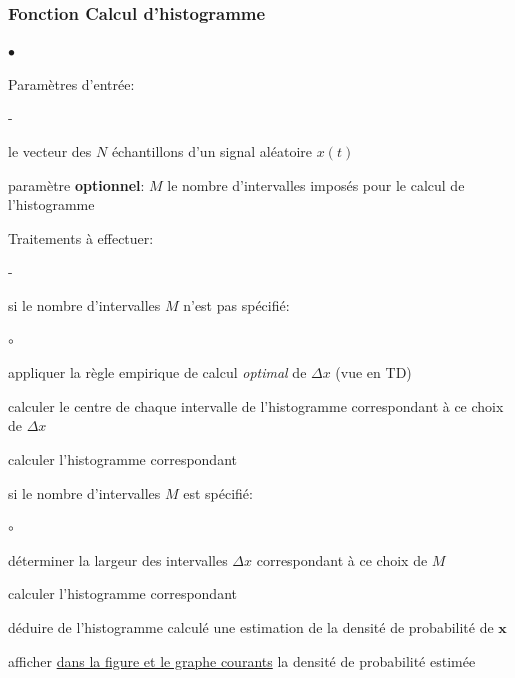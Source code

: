 \documentclass{article}
\begin{document}
\subsubsection{Fonction Calcul d'histogramme}

\begin{list}{$\bullet$}{\setlength{\leftmargin}{3mm} \setlength{\labelwidth}{20mm} \setlength{\labelsep}{2mm} \setlength{\itemsep}{1mm} }
\item Paramètres d'entrée:
\begin{list}{-}{\setlength{\leftmargin}{3mm} \setlength{\labelwidth}{20mm} \setlength{\labelsep}{2mm} \setlength{\itemsep}{1mm} }
\item le vecteur des $N$ échantillons d'un signal aléatoire $x(t)$
\item paramètre \textbf{optionnel}: $M$ le nombre d'intervalles imposés pour le calcul de l'histogramme
\end{list}
\item Traitements à effectuer:
\begin{list}{-}{\setlength{\leftmargin}{3mm} \setlength{\labelwidth}{20mm} \setlength{\labelsep}{2mm} \setlength{\itemsep}{1mm} }
\item si le nombre d'intervalles $M$ n'est pas spécifié:
\begin{list}{$\circ$}{\setlength{\leftmargin}{3mm} \setlength{\labelwidth}{20mm} \setlength{\labelsep}{2mm} \setlength{\itemsep}{1mm} }
\item appliquer la règle empirique de calcul {\em optimal} de $\Delta x$ (vue en TD)
\item calculer le centre de chaque intervalle de l'histogramme correspondant à ce choix de $\Delta x$
\item calculer l'histogramme correspondant
\end{list}
\item si le nombre d'intervalles $M$ est spécifié:
\begin{list}{$\circ$}{\setlength{\leftmargin}{3mm} \setlength{\labelwidth}{20mm} \setlength{\labelsep}{2mm} \setlength{\itemsep}{1mm} }
\item déterminer la largeur des intervalles $\Delta x$ correspondant à ce choix de $M$
\item calculer l'histogramme correspondant
\end{list}
\item déduire de l'histogramme calculé une estimation de la densité de probabilité de $\mathbf{x}$
\item afficher \underline{dans la figure et le graphe courants} la densité de probabilité estimée

\end{list}
\end{list}
\end{document}
